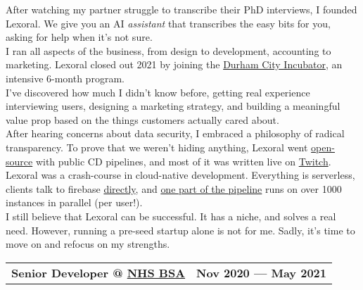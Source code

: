 \documentclass[hidelinks, 12pt, a4paper]{article}
\begin{document}
	\begin{multicols}{2}
		After watching my partner struggle to transcribe their PhD interviews, I founded Lexoral.
		We give you an AI \emph{assistant} that transcribes the easy bits for you, asking for help when it's not sure.\\
		
		I ran all aspects of the business, from design to development, accounting to marketing.
		Lexoral closed out 2021 by joining the \href{https://dcincubator.co.uk/}{Durham City Incubator}, an intensive 6-month program.\\
		
		I've discovered how much I didn't know before, getting real experience interviewing users, designing a marketing strategy, and building a meaningful value prop based on the things customers actually cared about.\\
		
		After hearing concerns about data security, I embraced a philosophy of radical transparency.
		To prove that we weren't hiding anything, Lexoral went \href{https://github.com/stevenwaterman/Lexoral/}{open-source} with public CD pipelines, and most of it was written live on \href{https://twitch.tv/lexoral}{Twitch}.\\
		
		Lexoral was a crash-course in cloud-native development.
		Everything is serverless, clients talk to firebase \href{https://lexoral.com/blog/svelte-firestore-binding/}{directly}, and \href{https://twitter.com/SteWaterman/status/1445041856023339011}{one part of the pipeline} runs on over 1000 instances in parallel (per user!).\\
		
		I still believe that Lexoral can be successful.
		It has a niche, and solves a real need.
		However, running a pre-seed startup alone is not for me.
		Sadly, it's time to move on and refocus on my strengths.\\
		
	\end{multicols}


	\begin{tabularx}{\linewidth}{@{}Xr@{}}
		\textbf{Senior Developer @ \href{https://www.nhsbsa.nhs.uk/}{NHS BSA}} & \textbf{Nov 2020 --- May 2021}
	\end{tabularx}\vspace{2pt}
	
\end{document}
